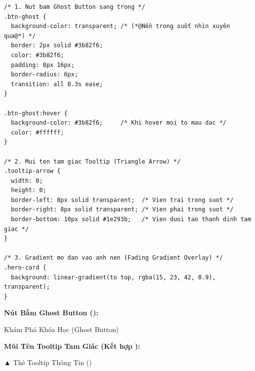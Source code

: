\begin{codeWindow}
\begin{lstlisting}[language=CSS3]
/* 1. Nut bam Ghost Button sang trong */
.btn-ghost {
  background-color: transparent; /* (*@Nền trong suốt nhìn xuyên qua@*) */
  border: 2px solid #3b82f6;
  color: #3b82f6;
  padding: 8px 16px;
  border-radius: 6px;
  transition: all 0.3s ease;
}

.btn-ghost:hover {
  background-color: #3b82f6;     /* Khi hover moi to mau dac */
  color: #ffffff;
}

/* 2. Mui ten tam giac Tooltip (Triangle Arrow) */
.tooltip-arrow {
  width: 0;
  height: 0;
  border-left: 8px solid transparent;  /* Vien trai trong suot */
  border-right: 8px solid transparent; /* Vien phai trong suot */
  border-bottom: 10px solid #1e293b;   /* Vien duoi tao thanh dinh tam giac */
}

/* 3. Gradient mo dan vao anh nen (Fading Gradient Overlay) */
.hero-card {
  background: linear-gradient(to top, rgba(15, 23, 42, 0.9), transparent);
}
\end{lstlisting}
\end{codeWindow}

\begin{browserWindow}
\vspace{2pt}
\begin{tcolorbox}[
    enhanced,
    colback=gray!5,
    colframe=gray!30,
    arc=6pt, boxrule=0.8pt,
    top=10pt, bottom=10pt, left=12pt, right=12pt
]
  {\sffamily\bfseries\color{primaryBlue} Nút Bấm Ghost Button ():}\\[4pt]
  \begin{tcolorbox}[nobeforeafter, colback=gray!5, colframe=blue!70!black, arc=4pt, boxrule=1.2pt, top=4pt, bottom=4pt, left=10pt, right=10pt, fontupper=\sffamily\bfseries\small\color{blue!70!black}]
    Khám Phá Khóa Học (Ghost Button)
  \end{tcolorbox}
  \vspace{6pt}
  
  {\sffamily\bfseries\color{primaryBlue} Mũi Tên Tooltip Tam Giác (Kết hợp ):}\\[4pt]
  \begin{tcolorbox}[nobeforeafter, colback=gray!90!black, colframe=gray!90!black, arc=3pt, boxrule=0.4pt, top=4pt, bottom=4pt, left=10pt, right=10pt, fontupper=\sffamily\bfseries\scriptsize\color{white}]
    ▲ \quad Thẻ Tooltip Thông Tin ()
  \end{tcolorbox}
\end{tcolorbox}
\end{browserWindow}

